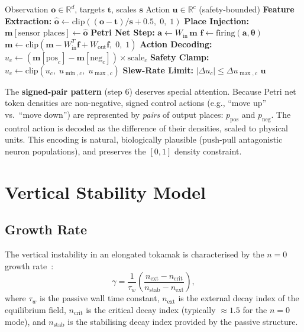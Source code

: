 \documentclass[12pt]{article}
\begin{document}
\begin{algorithm}[H]
\caption{Closed-Loop Control Tick}
\label{alg:control-tick}
\begin{algorithmic}[1]
  \Require Observation $\mathbf{o} \in \mathbb{R}^d$, targets
    $\mathbf{t}$, scales $\mathbf{s}$
  \Ensure Action $\mathbf{u} \in \mathbb{R}^c$ (safety-bounded)
  \State \textbf{Feature Extraction:}
    $\hat{\mathbf{o}} \gets \mathrm{clip}\!\left(
    (\mathbf{o} - \mathbf{t}) / \mathbf{s} + 0.5, \; 0, \; 1\right)$
  \State \textbf{Place Injection:}
    $\mathbf{m}[\text{sensor places}] \gets \hat{\mathbf{o}}$
  \State \textbf{Petri Net Step:}
    $\mathbf{a} \gets W_{\mathrm{in}} \, \mathbf{m}$
  \State $\mathbf{f} \gets \text{firing}(\mathbf{a}, \boldsymbol{\theta})$
  \State $\mathbf{m} \gets \mathrm{clip}\!\left(
    \mathbf{m} - W_{\mathrm{in}}^T \mathbf{f}
    + W_{\mathrm{out}} \mathbf{f}, \; 0, \; 1\right)$
  \State \textbf{Action Decoding:}
    $u_c \gets (\mathbf{m}[\text{pos}_c] - \mathbf{m}[\text{neg}_c])
    \times \text{scale}_c$
  \State \textbf{Safety Clamp:}
    $u_c \gets \mathrm{clip}(u_c, \; u_{\min,c}, \; u_{\max,c})$
  \State \textbf{Slew-Rate Limit:}
    $|\Delta u_c| \le \Delta u_{\max,c}$
  \State \Return $\mathbf{u}$
\end{algorithmic}
\end{algorithm}

The \textbf{signed-pair pattern} (step 6) deserves special attention.
Because Petri net token densities are non-negative, signed control
actions (e.g., ``move up'' vs.\ ``move down'') are represented by
\emph{pairs} of output places: $p_{\text{pos}}$ and $p_{\text{neg}}$.
The control action is decoded as the difference of their densities,
scaled to physical units.  This encoding is natural, biologically
plausible (push-pull antagonistic neuron populations), and preserves the
$[0,1]$ density constraint.


\section{Vertical Stability Model}
\label{sec:vstab}

\subsection{Growth Rate}

The vertical instability in an elongated tokamak is characterised by
the $n = 0$ growth rate~\citep{Lazarus1990}:
\begin{equation}
  \gamma = \frac{1}{\tau_w} \left(\frac{n_{\mathrm{ext}} - n_{\mathrm{crit}}}{n_{\mathrm{stab}} - n_{\mathrm{ext}}}\right),
  \label{eq:growth-rate}
\end{equation}
where $\tau_w$ is the passive wall time constant, $n_{\mathrm{ext}}$ is
the external decay index of the equilibrium field, $n_{\mathrm{crit}}$
is the critical decay index (typically $\approx 1.5$ for the $n = 0$
mode), and $n_{\mathrm{stab}}$ is the stabilising decay index provided
by the passive structure.
\end{document}
